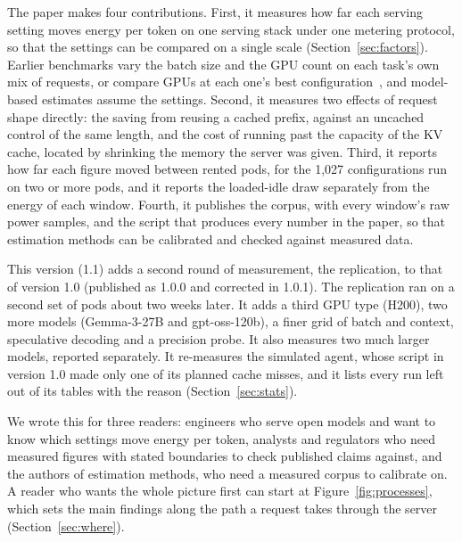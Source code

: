 \documentclass[11pt]{article}
\begin{document}
The paper makes four contributions. First, it measures how far each serving setting moves energy per token on one serving stack under one metering protocol, so that the settings can be compared on a single scale (Section~\ref{sec:factors}). Earlier benchmarks vary the batch size and the GPU count on each task's own mix of requests, or compare GPUs at each one's best configuration~\citep{chung2026joules,chung2025mlenergy}, and model-based estimates assume the settings. Second, it measures two effects of request shape directly: the saving from reusing a cached prefix, against an uncached control of the same length, and the cost of running past the capacity of the KV cache, located by shrinking the memory the server was given. Third, it reports how far each figure moved between rented pods, for the 1,027 configurations run on two or more pods, and it reports the loaded-idle draw separately from the energy of each window. Fourth, it publishes the corpus, with every window's raw power samples, and the script that produces every number in the paper, so that estimation methods can be calibrated and checked against measured data.

This version (1.1) adds a second round of measurement, the replication, to that of version 1.0 (published as 1.0.0 and corrected in 1.0.1). The replication ran on a second set of pods about two weeks later. It adds a third GPU type (H200), two more models (Gemma-3-27B and gpt-oss-120b), a finer grid of batch and context, speculative decoding and a precision probe. It also measures two much larger models, reported separately. It re-measures the simulated agent, whose script in version 1.0 made only one of its planned cache misses, and it lists every run left out of its tables with the reason (Section~\ref{sec:stats}).

We wrote this for three readers: engineers who serve open models and want to know which settings move energy per token, analysts and regulators who need measured figures with stated boundaries to check published claims against, and the authors of estimation methods, who need a measured corpus to calibrate on. A reader who wants the whole picture first can start at Figure~\ref{fig:processes}, which sets the main findings along the path a request takes through the server (Section~\ref{sec:where}).
\end{document}
